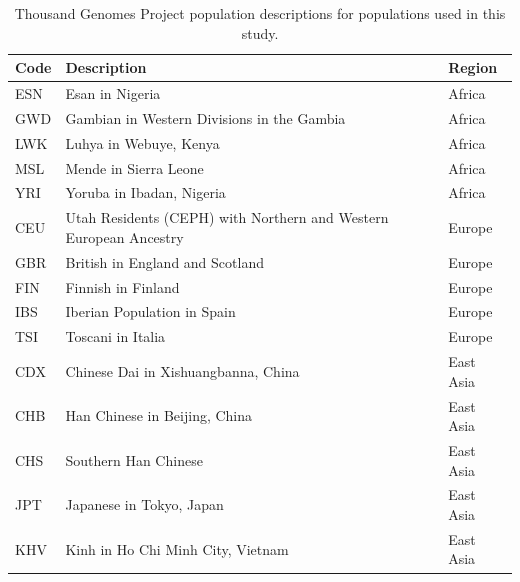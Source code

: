 \documentclass[]{article}
\begin{document}
\begin{table}[ht!]
    \centering
    \begin{tabular}{lll}
        \toprule
        Code & Description & Region\\
        \midrule
        ESN & Esan in Nigeria & Africa\\
        GWD & Gambian in Western Divisions in the Gambia & Africa\\
        LWK & Luhya in Webuye, Kenya & Africa\\
        MSL & Mende in Sierra Leone & Africa\\
        YRI & Yoruba in Ibadan, Nigeria & Africa\\
        \addlinespace
        CEU & Utah Residents (CEPH) with Northern and Western European Ancestry & Europe\\
        GBR & British in England and Scotland & Europe\\
        FIN & Finnish in Finland & Europe\\
        IBS & Iberian Population in Spain & Europe\\
        TSI & Toscani in Italia & Europe\\
        \addlinespace
        CDX & Chinese Dai in Xishuangbanna, China & East Asia\\
        CHB & Han Chinese in Beijing, China & East Asia\\
        CHS & Southern Han Chinese & East Asia\\
        JPT & Japanese in Tokyo, Japan & East Asia\\
        KHV & Kinh in Ho Chi Minh City, Vietnam & East Asia\\
        \bottomrule
    \end{tabular}
    \caption{Thousand Genomes Project population descriptions for populations used in this study.}
    \label{tab:1kgpops}
\end{table}
\end{document}
